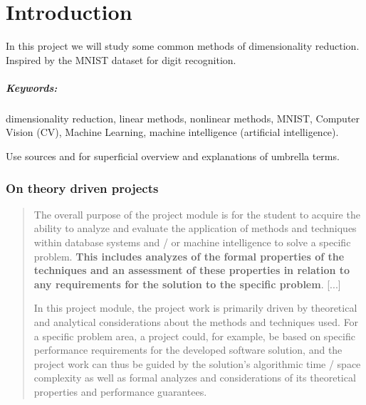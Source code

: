 \chapter{Introduction}\label{cha:introduction}
\noindent
In this project we will study some common methods of dimensionality reduction. Inspired by the MNIST dataset for digit recognition.

\paragraph{Keywords:} dimensionality reduction, linear methods, nonlinear methods, MNIST, Computer Vision (CV), Machine Learning, machine intelligence (artificial intelligence).

Use sources \cite{IBM-machine-intelligence} and \cite{IBM-computer-vision} for superficial overview and explanations of umbrella terms.


\subsection*{On theory driven projects}
\blockcquote{Projectmodule}{The overall purpose of the project module is for the student to acquire the ability to analyze and evaluate the application of methods and techniques within database systems and / or machine intelligence to solve a specific problem. \textbf{This includes analyzes of the formal properties of the techniques and an assessment of these properties in relation to any requirements for the solution to the specific problem}. [...]

In this project module, the project work is primarily driven by theoretical and analytical considerations about the methods and techniques used. For a specific problem area, a project could, for example, be based on specific performance requirements for the developed software solution, and the project work can thus be guided by the solution's algorithmic time / space complexity as well as formal analyzes and considerations of its theoretical properties and performance guarantees.}



